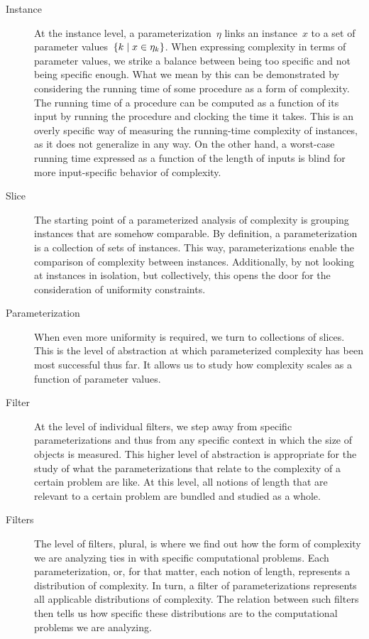 \begin{description}
\item[Instance]
  At the instance level, a parameterization~$\eta$ links an instance~$x$ to a set of parameter values~$\{k \;|\; x \in \eta_k\}$.
  When expressing complexity in terms of parameter values, we strike a balance between being too specific and not being specific enough.
  What we mean by this can be demonstrated by considering the running time of some procedure as a form of complexity.
  The running time of a procedure can be computed as a function of its input by running the procedure and clocking the time it takes.
  This is an overly specific way of measuring the running-time complexity of instances, as it does not generalize in any way.
  On the other hand, a worst-case running time expressed as a function of the length of inputs is blind for more input-specific behavior of complexity.
\item[Slice]
  The starting point of a parameterized analysis of complexity is grouping instances that are somehow comparable.
  By definition, a parameterization is a collection of sets of instances.
  This way, parameterizations enable the comparison of complexity between instances.
  Additionally, by not looking at instances in isolation, but collectively, this opens the door for the consideration of uniformity constraints.
\item[Parameterization]
  When even more uniformity is required, we turn to collections of slices.
  This is the level of abstraction at which parameterized complexity has been most successful thus far.
  It allows us to study how complexity scales as a function of parameter values.
\item[Filter]
  At the level of individual filters, we step away from specific parameterizations and thus from any specific context in which the size of objects is measured.
  This higher level of abstraction is appropriate for the study of what the parameterizations that relate to the complexity of a certain problem are like.
  At this level, all notions of length that are relevant to a certain problem are bundled and studied as a whole.
\item[Filters]
  The level of filters, plural, is where we find out how the form of complexity we are analyzing ties in with specific computational problems.
  Each parameterization, or, for that matter, each notion of length, represents a distribution of complexity.
  In turn, a filter of parameterizations represents all applicable distributions of complexity.
  The relation between such filters then tells us how specific these distributions are to the computational problems we are analyzing.
\end{description}

